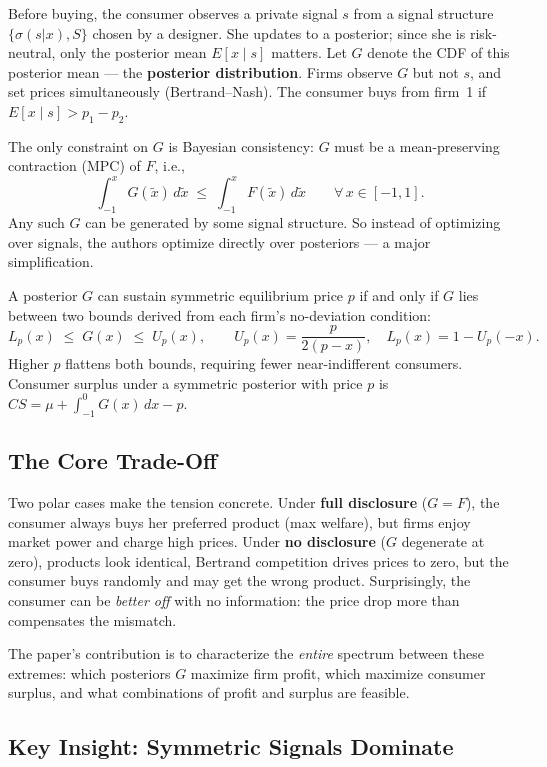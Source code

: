 \documentclass[12pt, a4paper]{article}
\begin{document}
Before buying, the consumer observes a private signal $s$ from a signal structure $\{\sigma(s|x), S\}$ chosen by a designer. She updates to a posterior; since she is risk-neutral, only the posterior mean $E[x \mid s]$ matters. Let $G$ denote the CDF of this posterior mean --- the \textbf{posterior distribution}. Firms observe $G$ but not $s$, and set prices simultaneously (Bertrand--Nash). The consumer buys from firm~1 if $E[x \mid s] > p_1 - p_2$.

The only constraint on $G$ is Bayesian consistency: $G$ must be a mean-preserving contraction (MPC) of $F$, i.e.,
$$\int_{-1}^{x} G(\tilde{x})\,d\tilde{x} \;\leq\; \int_{-1}^{x} F(\tilde{x})\,d\tilde{x} \qquad \forall\, x \in [-1,1].$$
Any such $G$ can be generated by some signal structure. So instead of optimizing over signals, the authors optimize directly over posteriors --- a major simplification.

A posterior $G$ can sustain symmetric equilibrium price $p$ if and only if $G$ lies between two bounds derived from each firm's no-deviation condition:
$$L_p(x) \;\leq\; G(x) \;\leq\; U_p(x), \qquad U_p(x) = \frac{p}{2(p-x)}, \quad L_p(x) = 1 - U_p(-x).$$
Higher $p$ flattens both bounds, requiring fewer near-indifferent consumers. Consumer surplus under a symmetric posterior with price $p$ is $CS = \mu + \int_{-1}^{0} G(x)\,dx - p$.

\subsection{The Core Trade-Off}

Two polar cases make the tension concrete. Under \textbf{full disclosure} ($G = F$), the consumer always buys her preferred product (max welfare), but firms enjoy market power and charge high prices. Under \textbf{no disclosure} ($G$ degenerate at zero), products look identical, Bertrand competition drives prices to zero, but the consumer buys randomly and may get the wrong product. Surprisingly, the consumer can be \emph{better off} with no information: the price drop more than compensates the mismatch.

The paper's contribution is to characterize the \emph{entire} spectrum between these extremes: which posteriors $G$ maximize firm profit, which maximize consumer surplus, and what combinations of profit and surplus are feasible.

\subsection{Key Insight: Symmetric Signals Dominate}
\end{document}
